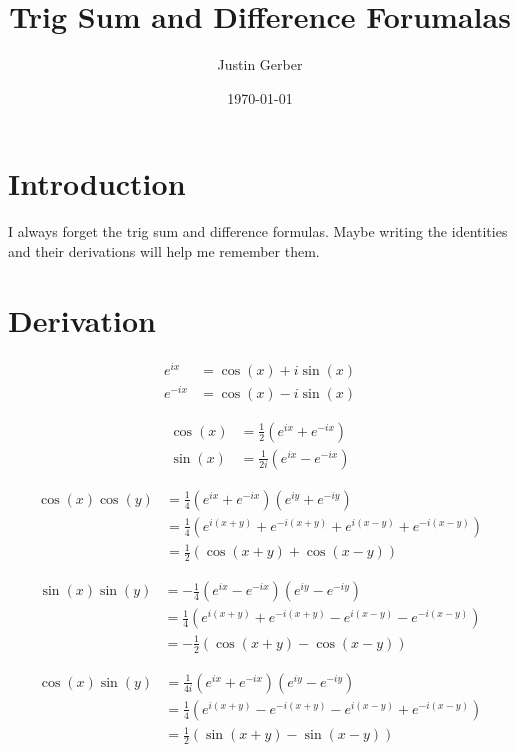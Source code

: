 \documentclass[12pt]{article}
\begin{document}
\title{Trig Sum and Difference Forumalas}
\author{Justin Gerber}
\date{\today}
\maketitle

\section{Introduction}

I always forget the trig sum and difference formulas. Maybe writing the identities and their derivations will help me remember them.

\section{Derivation}

\begin{align}
e^{ix} & = \cos(x) + i \sin(x)\\
e^{-ix} &= \cos(x) - i \sin(x)
\end{align}

\begin{align}
\cos(x) &= \frac{1}{2}\left( e^{ix} + e^{-ix}\right)\\
\sin(x) &= \frac{1}{2i}\left( e^{ix} - e^{-ix} \right)
\end{align}

\begin{align}
\cos(x)\cos(y) &= \frac{1}{4} \left(e^{ix} + e^{-ix}\right)\left( e^{iy} + e^{-iy} \right)\\
&=\frac{1}{4}\left( e^{i(x+y)} + e^{-i(x+y)} + e^{i(x-y)} + e^{-i(x-y)}\right)\\
&=\frac{1}{2}\left(\cos(x+y) + \cos(x-y)\right)
\end{align}

\begin{align}
\sin(x)\sin(y) &= -\frac{1}{4} \left(e^{ix} - e^{-ix}\right)\left( e^{iy} - e^{-iy} \right)\\
&=\frac{1}{4}\left( e^{i(x+y)} + e^{-i(x+y)} - e^{i(x-y)} - e^{-i(x-y)}\right)\\
&=-\frac{1}{2}\left(\cos(x+y) - \cos(x-y)\right)
\end{align}

\begin{align}
\cos(x)\sin(y) &= \frac{1}{4i} \left(e^{ix} + e^{-ix}\right)\left( e^{iy} - e^{-iy} \right)\\
&=\frac{1}{4}\left( e^{i(x+y)} - e^{-i(x+y)} - e^{i(x-y)} + e^{-i(x-y)}\right)\\
&=\frac{1}{2}\left(\sin(x+y) - \sin(x-y)\right)
\end{align}
\end{document}
